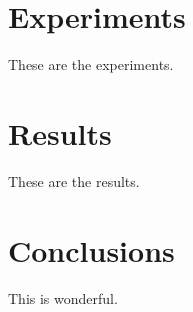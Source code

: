 \documentclass[10pt,twocolumn,letterpaper]{article}
\begin{document}
\section{Experiments}

These are the experiments.

\section{Results}

These are the results.

\section{Conclusions}

This is wonderful.

{\small


}
\end{document}
